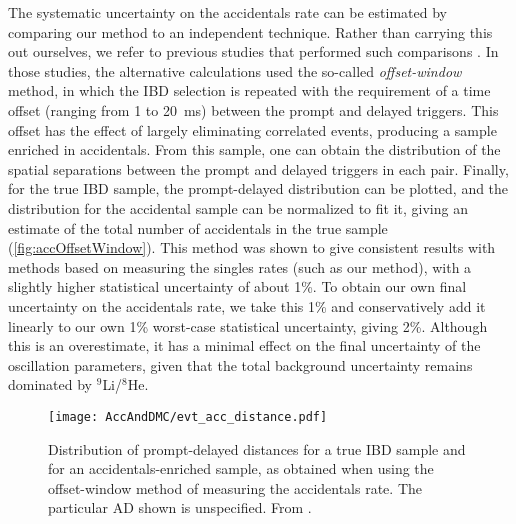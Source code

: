 \documentclass[../thesis.tex]{subfiles}
\begin{document}
The systematic uncertainty on the accidentals rate can be estimated by comparing our method to an independent technique. Rather than carrying this out ourselves, we refer to previous studies that performed such comparisons \cite{An_2017}. In those studies, the alternative calculations used the so-called \emph{offset-window} method, in which the IBD selection is repeated with the requirement of a time offset (ranging from 1 to 20~ms) between the prompt and delayed triggers. This offset has the effect of largely eliminating correlated events, producing a sample enriched in accidentals. From this sample, one can obtain the distribution of the spatial separations between the prompt and delayed triggers in each pair. Finally, for the true IBD sample, the prompt-delayed distribution can be plotted, and the distribution for the accidental sample can be normalized to fit it, giving an estimate of the total number of accidentals in the true sample (\autoref{fig:accOffsetWindow}). This method was shown to give consistent results with methods based on measuring the singles rates (such as our method), with a slightly higher statistical uncertainty of about 1\%. To obtain our own final uncertainty on the accidentals rate, we take this 1\% and conservatively add it linearly to our own 1\% worst-case statistical uncertainty, giving 2\%. Although this is an overestimate, it has a minimal effect on the final uncertainty of the oscillation parameters, given that the total background uncertainty remains dominated by $^9$Li/$^8$He.

\begin{figure}[ht]
  \texttt{[image: AccAndDMC/evt\_acc\_distance.pdf]}
  
  \caption{Distribution of prompt-delayed distances for a true IBD sample and for an accidentals-enriched sample, as obtained when using the offset-window method of measuring the accidentals rate. The particular AD shown is unspecified. From \cite{An_2017}.}
    \label{fig:accOffsetWindow}
\end{figure}


\end{document}
